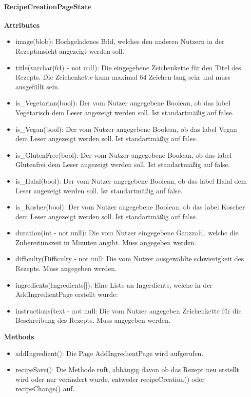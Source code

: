 \documentclass[parskip=full]{scrartcl}
\begin{document}
\paragraph{RecipeCreationPageState}
\textbf{Attributes}
\begin{itemize}
    \item image(blob): Hochgeladenes Bild, welches den anderen Nutzern in der Rezeptansicht angezeigt werden soll.
    \item title(varchar(64) - not null): Die eingegebene Zeichenkette für den Titel des Rezepts. Die Zeichenkette kann maximal 64 Zeichen lang sein und muss ausgefüllt sein.
    \item is\_Vegetarian(bool): Der vom Nutzer angegebene Boolean, ob das \gls{label} Vegetarisch dem Leser angezeigt werden soll. Ist standartmäßig auf false.
    \item is\_Vegan(bool): Der vom Nutzer angegebene Boolean, ob das \gls{label} Vegan dem Leser angezeigt werden soll. Ist standartmäßig auf false.
    \item is\_GlutenFree(bool): Der vom Nutzer angegebene Boolean, ob das \gls{label} Glutenfrei dem Leser angezeigt werden soll.  Ist standartmäßig auf false.
    \item is\_Halal(bool): Der vom Nutzer angegebene Boolean, ob das \gls{label} Halal dem Leser angezeigt werden soll.  Ist standartmäßig auf false.
    \item is\_Kosher(bool): Der vom Nutzer angegebene Boolean, ob das \gls{label} Koscher dem Leser angezeigt werden soll.  Ist standartmäßig auf false.
    \item duration(int - not null): Die vom Nutzer eingegebene Ganzzahl, welche die Zubereitunszeit in Minuten angibt. Muss angegeben werden.
    \item difficulty(Difficulty - not null: Die vom Nutzer ausgewählte \gls{schwierigkeit} des Rezepts. Muss angegeben werden.
    \item ingredients(Ingredients[]): Eine Liste an Ingerdients, welche in der AddIngredientPage erstellt wurde:
    \item instructions(text - not null: Die vom Nutzer angegeben Zeichenkette für die Beschreibung des Rezepts. Muss angegeben werden.
\end{itemize}

\textbf{Methods}
\begin{itemize}
    \item addIngredient(): Die Page AddIngredientPage wird aufgerufen.
    \item recipeSave(): Die Methode ruft, abhängig davon ob das Rezept neu erstellt wird oder nur verändert wurde, entweder recipeCreation() oder recipeChange() auf.
\end{itemize}
\end{document}
